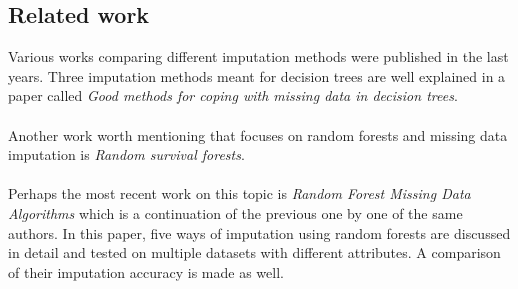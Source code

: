 \documentclass[11pt]{article}
\begin{document}
    \subsection{Related work}
      Various works comparing different imputation methods were published in the last years. Three imputation methods meant for decision trees are well explained in a paper called {\it Good methods for coping with missing data in decision trees}. \citep{mia}
      \\~\\
      Another work worth mentioning that focuses on random forests and missing data imputation is {\it Random survival forests}. \citep{rsf}
      \\~\\
      Perhaps the most recent work on this topic is {\it Random Forest Missing Data Algorithms} \citep{otfi} which is a continuation of the previous one by one of the same authors. In this paper, five ways of imputation using random forests are discussed in detail and tested on multiple datasets with different attributes. A comparison of their imputation accuracy is made as well.
    \\~\\
\end{document}
